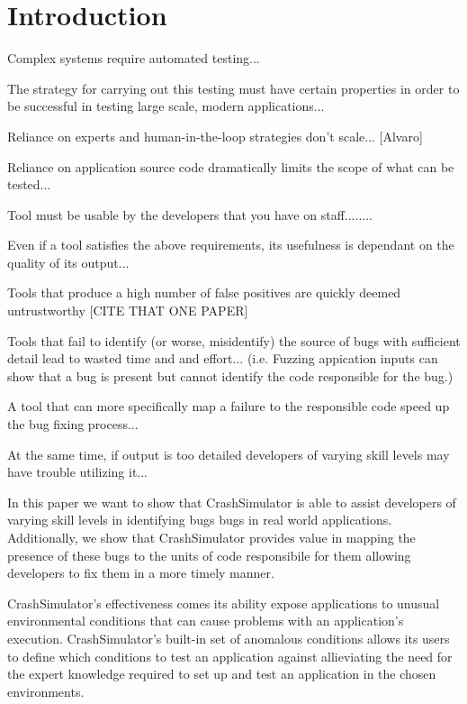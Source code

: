 \section{Introduction}
\label{SEC:introduction}

Complex systems require automated testing...

The strategy for carrying out this testing must have certain properties in
order to be successful in testing large scale, modern applications...

Reliance on experts and human-in-the-loop strategies don't scale...
[Alvaro]

Reliance on application source code dramatically limits the scope of what
can be tested...

Tool must be usable by the developers that you have on staff........

Even if a tool satisfies the above requirements, its usefulness is
dependant on the quality of its output...

Tools that produce a high number of false positives are quickly deemed
untrustworthy [CITE THAT ONE PAPER]

Tools that fail to identify (or worse, misidentify) the source of bugs with
sufficient detail lead to wasted time and and effort...  (i.e. Fuzzing
appication inputs can show that a bug is present but cannot identify the
code responsible for the bug.)

A tool that can more specifically map a failure to the responsible code
speed up the bug fixing process...

At the same time,  if output is too detailed developers of varying skill
levels may have trouble utilizing it...

In this paper we want to show that CrashSimulator is able to assist
developers of varying skill levels in identifying bugs bugs in real world
applications.  Additionally, we show that CrashSimulator provides value in
mapping the presence of these bugs to the units of code responsibile for
them allowing developers to fix them in a more timely manner.

CrashSimulator's effectiveness comes its ability expose applications to
unusual environmental conditions that can cause problems with an
application's execution.  CrashSimulator's built-in set of anomalous
conditions allows its users to define which conditions to test an
application against allieviating the need for the expert knowledge required
to set up and test an application in the chosen environments.


